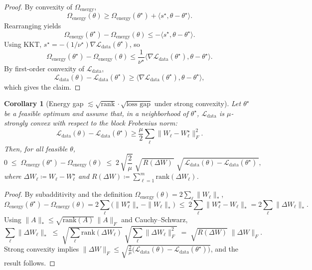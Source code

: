 \documentclass[a4paper,fleqn]{cas-sc}
\newtheorem{corollary}[theorem]{Corollary}
\theoremstyle{remark}
\theoremstyle{definition}
\begin{document}
\begin{proof}
By convexity of $\Omega_{\text{energy}}$,
\[
\Omega_{\text{energy}}(\theta)\ge \Omega_{\text{energy}}(\theta^\star)+\langle s^\star,\theta-\theta^\star\rangle.
\]
Rearranging yields
\[
\Omega_{\text{energy}}(\theta^\star)-\Omega_{\text{energy}}(\theta)\le -\langle s^\star,\theta-\theta^\star\rangle.
\]
Using KKT, $s^\star=-(1/\nu^\star)\nabla\mathcal{L}_{\text{data}}(\theta^\star)$, so
\[
\Omega_{\text{energy}}(\theta^\star)-\Omega_{\text{energy}}(\theta)\le \frac{1}{\nu^\star}\langle \nabla\mathcal{L}_{\text{data}}(\theta^\star),\theta-\theta^\star\rangle.
\]
By first-order convexity of $\mathcal{L}_{\text{data}}$,
\[
\mathcal{L}_{\text{data}}(\theta) - \mathcal{L}_{\text{data}}(\theta^\star)
\ge \langle \nabla\mathcal{L}_{\text{data}}(\theta^\star),\theta-\theta^\star\rangle,
\]
which gives the claim.
\end{proof}

\begin{corollary}[Energy gap $\lesssim \sqrt{\mathrm{rank}}\cdot\sqrt{\text{loss gap}}$ under strong convexity]\label{cor:energy_loss_rank_SC}
Let $\theta^\star$ be a feasible optimum and assume that, in a neighborhood of $\theta^\star$, $\mathcal{L}_{\text{data}}$ is $\mu$-strongly convex with respect to the block Frobenius norm:
\[
\mathcal{L}_{\text{data}}(\theta)-\mathcal{L}_{\text{data}}(\theta^\star)\ge \frac{\mu}{2}\sum_\ell\|W_\ell-W_\ell^\star\|_F^2.
\]
Then, for all feasible $\theta$,
\[
  0 \;\le\; \Omega_{\text{energy}}(\theta^\star)-\Omega_{\text{energy}}(\theta)
  \;\le\; 2\,\sqrt{\frac{2}{\mu}}\;\sqrt{\,R(\Delta W)\,}\;\sqrt{\,\mathcal{L}_{\text{data}}(\theta)-\mathcal{L}_{\text{data}}(\theta^\star)\,},
\]
where $\Delta W_\ell \coloneqq W_\ell - W_\ell^\star$ and $R(\Delta W)\coloneqq \sum_{\ell=1}^m \mathrm{rank}(\Delta W_\ell)$.
\end{corollary}

\begin{proof}
By subadditivity and the definition $\Omega_{\text{energy}}(\theta)=2\sum_\ell\|W_\ell\|_{\ast}$,
\[
\Omega_{\text{energy}}(\theta^\star)-\Omega_{\text{energy}}(\theta)
=2\sum_\ell \big(\|W_\ell^\star\|_{\ast}-\|W_\ell\|_{\ast}\big)
 \;\le\; 2\sum_\ell \|W_\ell^\star - W_\ell\|_{\ast}
 = 2\sum_\ell \|\Delta W_\ell\|_{\ast}.
\]
Using $\|A\|_{\ast}\le \sqrt{\mathrm{rank}(A)}\,\|A\|_F$ and Cauchy--Schwarz,
\[
  \sum_\ell \|\Delta W_\ell\|_{\ast}
  \;\le\; \sqrt{\sum_\ell \mathrm{rank}(\Delta W_\ell)}\;\sqrt{\sum_\ell \|\Delta W_\ell\|_F^2}
  \;=\; \sqrt{R(\Delta W)}\;\|\Delta W\|_F.
\]
Strong convexity implies $\|\Delta W\|_F \le \sqrt{\tfrac{2}{\mu}\big(\mathcal{L}_{\text{data}}(\theta)-\mathcal{L}_{\text{data}}(\theta^\star)\big)}$, and the result follows.
\end{proof}
\end{document}
